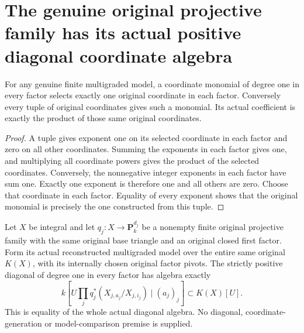 \section{The genuine original projective family has its actual positive diagonal coordinate algebra}
\label{sec:original-projective-positive-diagonal-algebra}
\begin{lemma}
\label{lem:actual-multimodel-all-one-coordinate-tuples}
\leanok
For any genuine finite multigraded model, a coordinate monomial of degree
one in every factor selects exactly one original coordinate in each
factor. Conversely every tuple of original coordinates gives such a
monomial. Its actual coefficient is exactly the product of those same
original coordinates.
\end{lemma}
\begin{proof}
A tuple gives exponent one on its selected coordinate in each factor
and zero on all other coordinates. Summing the exponents in each factor
gives one, and multiplying all coordinate powers gives the product of
the selected coordinates. Conversely, the nonnegative integer exponents
in each factor have sum one. Exactly one exponent is therefore one and
all others are zero. Choose that coordinate in each factor. Equality of
every exponent shows that the original monomial is precisely the one
constructed from this tuple.
\end{proof}
\begin{theorem}
\label{thm:actual-original-family-positive-diagonal-algebra}
\leanok
{}
Let $X$ be integral and let $q_j:X\to\mathbf P_k^{d_j}$ be a nonempty
finite original projective family with the same original base triangle
and an original closed first factor. Form its actual reconstructed
multigraded model over the entire same original $K(X)$, with its internally
chosen original factor pivots. The strictly positive diagonal of degree
one in every factor has algebra exactly
\[
 k\left[U\prod_jq_j^*(X_{j,a_j}/X_{j,i_j})\mid (a_j)_j\right]\subset K(X)[U].
\]
This is equality of the whole actual diagonal algebra. No diagonal,
coordinate-generation or model-comparison premise is supplied.
\end{theorem}
